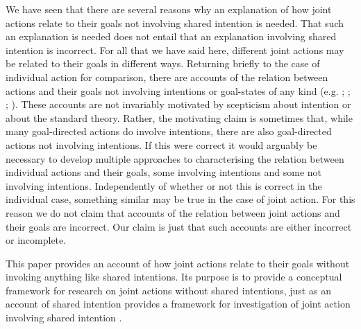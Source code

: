 \documentclass[12pt,a4paper]{extarticle}
\begin{document}
We have seen that there are several reasons why an explanation of how joint actions relate to their goals not involving shared intention is needed.  
That such an explanation is needed does not entail that an explanation involving shared intention is incorrect.  For all that we have said here, different joint actions may be related to their goals in different ways.  
Returning briefly to the case of individual action for comparison, there are accounts of the relation between actions and their goals not involving intentions or goal-states of any kind 
(e.g.
	\citealp{Bennett:1976rg};
	\citealp{Butterfill:2001kc};
	\citealp{Schueler:2003fk};
	\citealp{Taylor:1964tr}).
These accounts are not invariably motivated by scepticism about intention or about the standard theory.  Rather, the motivating claim is sometimes that, while many goal-directed actions do involve intentions, there are also goal-directed actions not involving intentions.  If this were correct it would arguably be necessary to develop multiple approaches to characterising the relation between individual actions and their goals, some involving intentions and some not involving intentions.  Independently of whether or not this is correct in the individual case, something similar may be true in the case of joint action.  For this reason we do not claim that accounts of the relation between joint actions and their goals are incorrect.  Our claim is just that such accounts are either incorrect or incomplete.

This paper provides an account of how joint actions relate to their goals without invoking anything like shared intentions.  
Its purpose is to provide a conceptual framework for research on joint actions without shared intentions, just as an account of shared intention provides a framework for investigation of joint action involving shared intention \citep[p.\ 150]{Bratman:2009lv}.  

\end{document}
